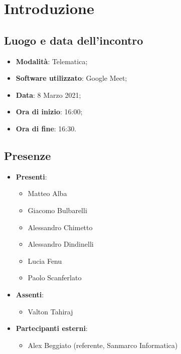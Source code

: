 \documentclass[]{article}
\begin{document}
	

	\newpage


	\section{Introduzione}
	\subsection{Luogo e data dell'incontro}
	\begin{itemize}
		\item \textbf{Modalità}: Telematica;
		\item \textbf{Software utilizzato}: Google Meet;
		\item \textbf{Data}: 8 Marzo 2021;
		\item \textbf{Ora di inizio}: 16:00;
		\item \textbf{Ora di fine}: 16:30.
	\end{itemize}

	\subsection{Presenze}
	\begin{itemize}
		\item \textbf{Presenti}:
		\begin{itemize}
			\item Matteo Alba
			\item Giacomo Bulbarelli
			\item Alessandro Chimetto
			\item Alessandro Dindinelli
			\item Lucia Fenu
			\item Paolo Scanferlato

		\end{itemize}
		\item \textbf{Assenti}:
		\begin{itemize}
			\item Valton Tahiraj

		\end{itemize}
		\item \textbf{Partecipanti esterni}:
		\begin{itemize}
			\item Alex Beggiato (referente, Sanmarco Informatica)
		\end{itemize}
	\end{itemize}
\end{document}
